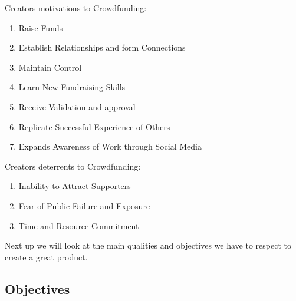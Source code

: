 Creators motivations to Crowdfunding:
\begin{enumerate}
      \item Raise Funds
      \item Establish Relationships and form Connections
      \item Maintain Control
      \item Learn New Fundraising Skills
      \item Receive Validation and approval
      \item Replicate Successful Experience of Others
      \item Expands Awareness  of Work  through Social Media
\end{enumerate}

Creators deterrents to Crowdfunding:
\begin{enumerate}
      \item Inability to Attract Supporters
      \item Fear of Public Failure and Exposure
      \item Time and Resource Commitment
\end{enumerate}

Next up we will look at the main qualities and objectives we have to respect to create a great product.
\subsection{Objectives}

